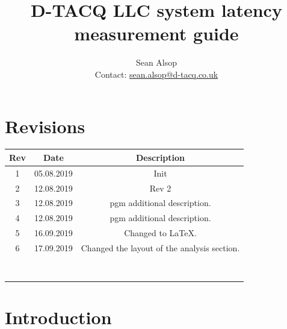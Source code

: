 \documentclass{article}
\begin{document}
\title{D-TACQ LLC system latency measurement guide}
\author{Sean Alsop \\ Contact: \href{mailto:sean.alsop@d-tacq.co.uk}{sean.alsop@d-tacq.co.uk} }

\maketitle

\tableofcontents

\section{Revisions}
\begin{tabular}{|c|c|c|}
	\hline
	Rev & Date & Description \\
	\hline
	1 & 05.08.2019 & Init \\
	\hline
	2 & 12.08.2019 & Rev 2 \\
	\hline
	3 & 12.08.2019 & pgm additional description. \\
	\hline
	4 & 12.08.2019 & pgm additional description. \\
	\hline
	5 & 16.09.2019 & Changed to LaTeX. \\
	\hline
	6 & 17.09.2019 & Changed the layout of the analysis section. \\
	\hline
	&  &  \\
	\hline
	&  &  \\
	\hline
	&  &  \\
	\hline
	&  &  \\
	\hline
	&  &  \\
	\hline
	&  &  \\
	\hline
	&  &  \\
	\hline
	&  &  \\
	\hline
\end{tabular} 

\newpage
\section{Introduction} \label{intro}
\end{document}
